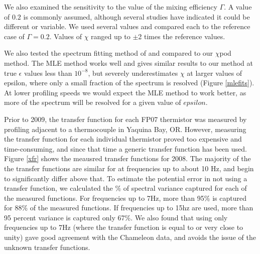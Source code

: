 \documentclass{ametsoc}
\begin{document}
We also examined the sensitivity to the value of the mixing efficiency $\Gamma$. A value of $0.2$ is commonly assumed, although several studies have indicated it could be different or variable. We used several values and compared each to the reference case of $\Gamma=0.2$. Values of $\chi$ ranged up to $\pm$2 times the reference values.


\appendix[B]


We also tested the spectrum fitting method of \cite{ruddicketal00} and compared to our $\chi$pod method. The MLE method works well and gives similar results to our method at true $\epsilon$ values less than $10^{-8}$, but severely underestimates $\chi$ at larger values of epsilon, where only a small fraction of the spectrum is resolved (Figure \ref{mlefits}). At lower profiling speeds we would expect the MLE method to work better, as more of the spectrum will be resolved for a given value of $epsilon$.


\appendix[D]

Prior to 2009, the transfer function for each FP07 thermistor was measured by profiling adjacent to a thermocouple in Yaquina Bay, OR. However, measuring the transfer function for each individual thermistor proved too expensive and time-consuming, and since that time a generic transfer function has been used. Figure \ref{xfr} shows the meausred transfer functions for 2008. The majority of the the transfer functions are similar for at frequencies up to about 10 Hz, and begin to significantly differ above that. To estimate the potential error in not using a transfer function, we calculated the $\%$ of spectral variance captured for each of the measured functions. For frequencies up to 7Hz, more than 95\% is captured for 88\% of the measured functions. If frequencies up to 15hz are used, more than 95 percent variance is captured only 67\%. We also found that using only frequencies up to 7Hz (where the transfer function is equal to or very close to unity) gave good agreement with the Chameleon data, and avoids the issue of the unknown transfer functions.



\end{document}
